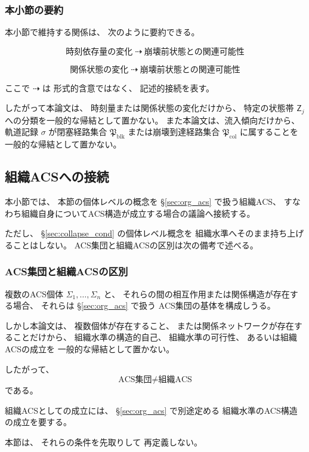 \subsubsection{本小節の要約}

\begin{remark}[流入記述の要約]
\label{rem:inflow_summary}
本小節で維持する関係は、
次のように要約できる。

\[
  \text{時刻依存量の変化}
  \;\dashrightarrow\;
  \text{崩壊前状態との関連可能性}
\]

\[
  \text{関係状態の変化}
  \;\dashrightarrow\;
  \text{崩壊前状態との関連可能性}
\]

ここで
$\dashrightarrow$
は
形式的含意ではなく、
記述的接続を表す。

したがって本論文は、
時刻量または関係状態の変化だけから、
特定の状態帯 $\mathsf{Z}_j$ への分類を一般的な帰結として置かない。
また本論文は、流入傾向だけから、
軌道記録 $\sigma$ が閉塞経路集合
$\mathfrak{P}_{\mathrm{blk}}$ または崩壊到達経路集合
$\mathfrak{P}_{\mathrm{col}}$ に属することを一般的な帰結として置かない。
\end{remark}

\subsection{組織ACSへの接続}
\label{subsec:to_section8}

本小節では、
本節の個体レベルの概念を
\S\ref{sec:org_acs}
で扱う組織ACS、
すなわち組織自身についてACS構造が成立する場合の議論へ接続する。

ただし、
\S\ref{sec:collapse_cond} の個体レベル概念を
組織水準へそのまま持ち上げることはしない。
ACS集団と組織ACSの区別は次の備考で述べる。

\subsubsection{ACS集団と組織ACSの区別}

\begin{remark}[ACS集団はそれだけでは組織ACSではない]
\label{rem:acs_group_vs_org_acs}
複数のACS個体
$\Sigma_1,\ldots,\Sigma_n$
と、
それらの間の相互作用または関係構造が存在する場合、
それらは
\S\ref{sec:org_acs}
で扱う
ACS集団の基体を構成しうる。

しかし本論文は、
複数個体が存在すること、
または関係ネットワークが存在することだけから、
組織水準の構造的自己、
組織水準の可行性、
あるいは組織ACSの成立を
一般的な帰結として置かない。

したがって、
\[
  \text{ACS集団}
  \neq
  \text{組織ACS}
\]
である。

組織ACSとしての成立には、
\S\ref{sec:org_acs}
で別途定める
組織水準のACS構造の成立を要する。

本節は、
それらの条件を先取りして
再定義しない。
\end{remark}

